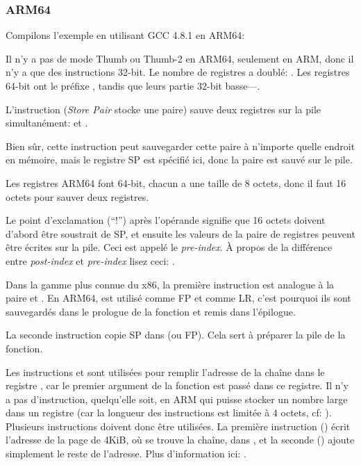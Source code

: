 ﻿\subsubsection{ARM64}


Compilons l'exemple en utilisant GCC 4.8.1 en ARM64:



Il n'y a pas de mode Thumb ou Thumb-2 en ARM64, seulement en ARM, donc il n'y a que des
instructions 32-bit.
Le nombre de registres a doublé: .
Les registres 64-bit ont le préfixe , tandis que leurs partie 32-bit basse---.

L'instruction  (\emph{Store Pair} stocke une paire)
sauve deux registres sur la pile simultanément:  et .

Bien sûr, cette instruction peut sauvegarder cette paire à n'importe quelle endroit en mémoire,
mais le registre \ac{SP} est spécifié ici, donc la paire est sauvé sur le pile.

Les registres ARM64 font 64-bit, chacun a une taille de 8 octets, donc il faut 16 octets pour sauver
deux registres.

Le point d'exclamation (``!'') après l'opérande signifie que 16 octets doivent d'abord être soustrait de \ac{SP},
et ensuite les valeurs de la paire de registres peuvent être écrites sur la pile.
Ceci est appelé le \emph{pre-index}.
À propos de la différence entre \emph{post-index} et \emph{pre-index}
lisez ceci: .

Dans la gamme plus connue du x86, la première instruction est analogue à la paire
 et .
En ARM64,  est utilisé comme \ac{FP} et  comme \ac{LR}, c'est pourquoi ils sont
sauvegardés dans le prologue de la fonction et remis dans l'épilogue.

La seconde instruction copie \ac{SP} dans  (ou \ac{FP}).
Cela sert à préparer la pile de la fonction.

\label{pointers_ADRP_and_ADD}
Les instructions  et \ADD sont utilisées pour remplir l'adresse de
la chaîne  dans le registre ,
car le premier argument de la fonction est passé dans ce registre.
Il n'y a pas d'instruction, quelqu'elle soit, en ARM qui puisse stocker un nombre large
dans un registre (car la longueur des instructions est limitée à 4 octets, cf: ).
Plusieurs instructions doivent donc être utilisées. La première instruction () écrit l'adresse de
la page de 4KiB, où se trouve la chaîne, dans , et la seconde (\ADD) ajoute simplement
le reste de l'adresse.
Plus d'information ici: .

